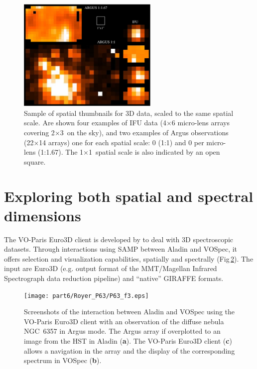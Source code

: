 \begin{figure}[!ht]
\begin{center}
    \includegraphics[width=0.6\textwidth]{part6/Royer_P63/P63_f2.eps}
\end{center}
\caption{Sample of spatial thumbnails for 3D data, scaled to the same spatial scale. Are shown four examples of IFU data (4$\times$6 micro-lens arrays covering 2\arcsec$\times$3\arcsec\ on the sky), and two examples of Argus observations (22$\times$14 arrays) one for each spatial scale:  0 (1:1) and 0 per micro-lens (1:1.67). The 1\arcsec$\times$1\arcsec\ spatial scale is also indicated by an open square.}
\label{thumbnails}
\end{figure}

\section{Exploring both spatial and spectral dimensions}
The VO-Paris Euro3D client is developed by \citet{Chn_08} to deal with 3D spectroscopic datasets. Through interactions using SAMP between Aladin and VOSpec, it offers selection and visualization capabilities, spatially and spectrally (Fig\,\ref{aladin}). The input are Euro3D (e.g.  output format of the MMT/Magellan Infrared Spectrograph data reduction pipeline) and ``native'' GIRAFFE formats. 
\begin{figure}[!ht]
\begin{center}
    \texttt{[image: part6/Royer\_P63/P63\_f3.eps]}
\end{center}
\caption{Screenshots of the interaction between Aladin and VOSpec using the VO-Paris Euro3D client \citep{Chn_08} with an observation of the diffuse nebula NGC~6357 in Argus mode. The Argus array if overplotted to an image from the HST in Aladin (\textbf{a}). The VO-Paris Euro3D client (\textbf{c}) allows a navigation in the array and the display of the corresponding spectrum in VOSpec (\textbf{b}).}
\label{aladin}
\end{figure}





